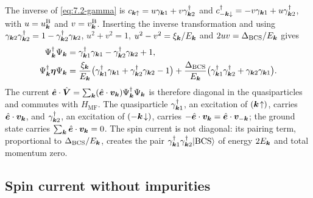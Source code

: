The inverse of \cref{eq:7.2-gamma} is $c_{\bm{k}\uparrow} = u\gamma_{\bm{k}1} + v\gamma^\dagger_{\bm{k}2}$ and $c^\dagger_{-\bm{k}\downarrow} = -v\gamma_{\bm{k}1} + u\gamma^\dagger_{\bm{k}2}$, with $u = u^{\mathrm{B}}_{\bm{k}}$ and $v = v^{\mathrm{B}}_{\bm{k}}$. Inserting the inverse transformation and using $\gamma_{\bm{k}2}\gamma^\dagger_{\bm{k}2} = 1 - \gamma^\dagger_{\bm{k}2}\gamma_{\bm{k}2}$, $u^2 + v^2 = 1$, $u^2 - v^2 = \xi_{\bm{k}}/E_{\bm{k}}$ and $2uv = \Delta_{\mathrm{BCS}}/E_{\bm{k}}$ gives
\begin{equation}
  \begin{aligned}
  \Psi^\dagger_{\bm{k}}\Psi_{\bm{k}} &= \gamma^\dagger_{\bm{k}1}\gamma_{\bm{k}1} - \gamma^\dagger_{\bm{k}2}\gamma_{\bm{k}2} + 1 , \\
  \Psi^\dagger_{\bm{k}}\boldsymbol{\eta}\Psi_{\bm{k}} &= \frac{\xi_{\bm{k}}}{E_{\bm{k}}}\bigl(\gamma^\dagger_{\bm{k}1}\gamma_{\bm{k}1} + \gamma^\dagger_{\bm{k}2}\gamma_{\bm{k}2} - 1\bigr) + \frac{\Delta_{\mathrm{BCS}}}{E_{\bm{k}}}\bigl(\gamma^\dagger_{\bm{k}1}\gamma^\dagger_{\bm{k}2} + \gamma_{\bm{k}2}\gamma_{\bm{k}1}\bigr) .
  \end{aligned}
  \label{eq:D.40-bogo}
\end{equation}
The current $\hat{\bm{e}}\cdot\hat{\bm{V}} = \sum_{\bm{k}}(\hat{\bm{e}}\cdot\bm{v}_{\bm{k}})\Psi^\dagger_{\bm{k}}\Psi_{\bm{k}}$ is therefore diagonal in the quasiparticles and commutes with $H_{\mathrm{MF}}$. The quasiparticle $\gamma^\dagger_{\bm{k}1}$, an excitation of $(\bm{k}\!\uparrow)$, carries $\hat{\bm{e}}\cdot\bm{v}_{\bm{k}}$, and $\gamma^\dagger_{\bm{k}2}$, an excitation of $(-\bm{k}\!\downarrow)$, carries $-\hat{\bm{e}}\cdot\bm{v}_{\bm{k}} = \hat{\bm{e}}\cdot\bm{v}_{-\bm{k}}$; the ground state carries $\sum_{\bm{k}}\hat{\bm{e}}\cdot\bm{v}_{\bm{k}} = 0$. The spin current is not diagonal: its pairing term, proportional to $\Delta_{\mathrm{BCS}}/E_{\bm{k}}$, creates the pair $\gamma^\dagger_{\bm{k}1}\gamma^\dagger_{\bm{k}2}|\mathrm{BCS}\rangle$ of energy $2E_{\bm{k}}$ and total momentum zero.

\subsection*{Spin current without impurities}

